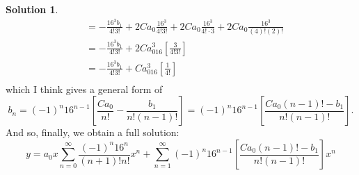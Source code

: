 \documentclass[10pt]{article}
\theoremstyle{definition}
\newtheorem{soln}{Solution}
\begin{document}
\begin{soln}
\begin{align*}
          & =-\frac{16^3b_1}{4!3!}+2Ca_0\frac{16^3}{4!3!}+2Ca_0\frac{16^3}{4!\cdot 3}+2Ca_0\frac{16^3}{(4)!(2)!}                                                                                           \\
          & =-\frac{16^3b_1}{4!3!}+2Ca_016^3\left[\frac{3}{4!3!}\right]                                                                                                                                    \\
          & =-\frac{16^3b_1}{4!3!}+Ca_016^3\left[\frac{1}{4!}\right]                                                                                                                                       \\
  \end{align*}
  which I think gives a general form of
  $$b_n=(-1)^{n}16^{n-1}\left[\frac{Ca_0}{n!}-\frac{b_1}{n!(n-1)!}\right]=(-1)^{n}16^{n-1}\left[\frac{Ca_0(n-1)!-b_1}{n!(n-1)!}\right].$$
  And so, finally, we obtain a full solution:
  $$y=a_0x\sum_{n=0}^{\infty}\frac{(-1)^n16^n}{(n+1)!n!}x^{n}+\sum_{n=1}^{\infty}(-1)^{n}16^{n-1}\left[\frac{Ca_0(n-1)!-b_1}{n!(n-1)!}\right]x^{n}$$





\end{soln}
\end{document}
